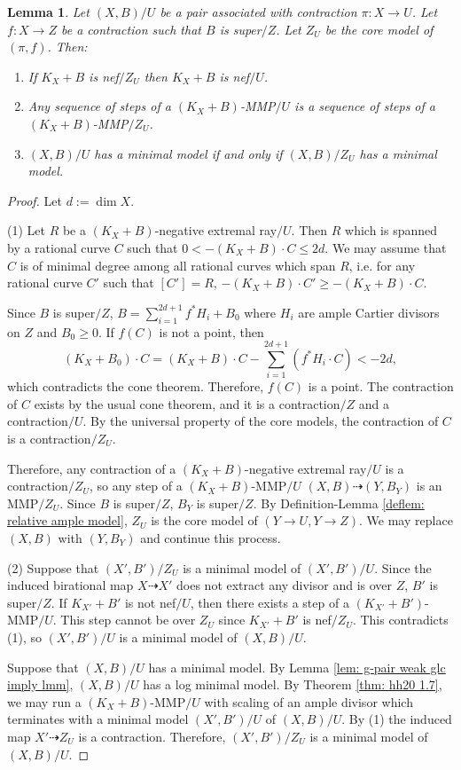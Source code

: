 \documentclass[11pt]{amsart}
\numberwithin{equation}{section}
\newtheorem{lem}[thm]{Lemma}
\theoremstyle{definition}
\theoremstyle{definition}
\theoremstyle{definition}
\begin{document}
\begin{lem}\label{lem: super minimal model over zu}
    Let $(X,B)/U$ be a pair associated with contraction $\pi: X\rightarrow U$. Let $f: X\rightarrow Z$ be a contraction such that $B$ is super$/Z$. Let $Z_U$ be the core model of $(\pi,f)$. Then:
    \begin{enumerate}
    \item If $K_X+B$ is nef$/Z_U$ then $K_X+B$ is nef$/U$.
    \item Any sequence of steps of a $(K_X+B)$-MMP$/U$ is a sequence of steps of a $(K_X+B)$-MMP$/Z_U$.
        \item $(X,B)/U$ has a minimal model if and only if $(X,B)/Z_U$ has a minimal model.
    \end{enumerate}
\end{lem}
\begin{proof}
Let $d:=\dim X$.

(1) Let $R$ be a $(K_X+B)$-negative extremal ray$/U$. Then $R$ which is spanned by a rational curve $C$ such that $0<-(K_{X}+B)\cdot C\leq 2d$. We may assume that $C$ is of minimal degree among all rational curves which span $R$, i.e. for any rational curve $C'$ such that $[C']=R$, $-(K_X+B)\cdot C'\geq -(K_X+B)\cdot C$.

Since $B$ is super$/Z$, $B=\sum_{i=1}^{2d+1}f^*H_i+B_0$ where $H_i$ are ample Cartier divisors on $Z$ and $B_0\geq 0$. If $f(C)$ is not a point, then
$$(K_X+B_0)\cdot C=(K_X+B)\cdot C-\sum_{i=1}^{2d+1}(f^*H_i\cdot C)<-2d,$$
which contradicts the cone theorem. Therefore, $f(C)$ is a point. The contraction of $C$ exists by the usual cone theorem, and it is a contraction$/Z$ and a contraction$/U$. By the universal property of the core models, the contraction of $C$ is a contraction$/Z_U$. 

Therefore, any contraction of a $(K_X+B)$-negative extremal ray$/U$ is a contraction$/Z_U$, so any step of a $(K_X+B)$-MMP$/U$ $(X,B)\dashrightarrow (Y,B_Y)$ is an MMP$/Z_U$. Since $B$ is super$/Z$, $B_Y$ is super$/Z$. By Definition-Lemma \ref{deflem: relative ample model}, $Z_U$ is the core model of $(Y\rightarrow U,Y\rightarrow Z)$. We may replace $(X,B)$ with $(Y,B_Y)$ and continue this process.

(2) Suppose that $(X',B')/Z_U$ is a minimal model of $(X',B')/U$. Since the induced birational map $X\dashrightarrow X'$ does not extract any divisor and is over $Z$, $B'$ is super$/Z$. If $K_{X'}+B'$ is not nef$/U$, then there exists a step of a $(K_{X'}+B')$-MMP$/U$. This step cannot be over $Z_U$ since $K_{X'}+B'$ is nef$/Z_U$. This contradicts (1), so $(X',B')/U$ is a minimal model of $(X,B)/U$.

Suppose that $(X,B)/U$ has a minimal model. By Lemma \ref{lem: g-pair weak glc imply lmm}, $(X,B)/U$ has a log minimal model. By Theorem \ref{thm: hh20 1.7}, we may run a $(K_X+B)$-MMP$/U$ with scaling of an ample divisor which terminates with a minimal model $(X',B')/U$ of $(X,B)/U$. By (1) the induced map $X'\dashrightarrow Z_U$ is a contraction. Therefore, $(X',B')/Z_U$ is a minimal model of $(X,B)/U$.
\end{proof}
\end{document}
